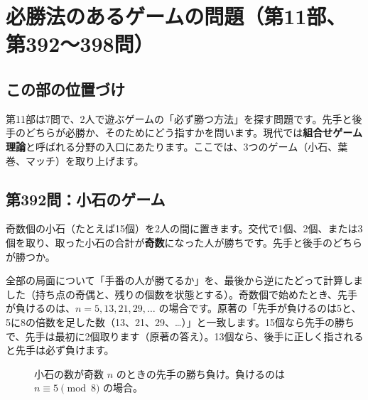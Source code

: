 \documentclass[a4paper,11pt,openany]{ltjsbook}
\begin{document}
\chapter{必勝法のあるゲームの問題（第11部、第392〜398問）}

\section{この部の位置づけ}

第11部は7問で、2人で遊ぶゲームの「必ず勝つ方法」を探す問題です。先手と後手のどちらが必勝か、そのためにどう指すかを問います。現代では\textbf{組合せゲーム理論}と呼ばれる分野の入口にあたります。ここでは、3つのゲーム（小石、葉巻、マッチ）を取り上げます。

\section{第392問：小石のゲーム}

奇数個の小石（たとえば15個）を2人の間に置きます。交代で1個、2個、または3個を取り、取った小石の合計が\textbf{奇数}になった人が勝ちです。先手と後手のどちらが勝つか。

全部の局面について「手番の人が勝てるか」を、最後から逆にたどって計算しました（持ち点の奇偶と、残りの個数を状態とする）。奇数個で始めたとき、先手が負けるのは、$n=5,13,21,29,\ldots$ の場合です。原著の「先手が負けるのは5と、5に8の倍数を足した数（13、21、29、…）」と一致します。15個なら先手の勝ちで、先手は最初に2個取ります（原著の答え）。13個なら、後手に正しく指されると先手は必ず負けます。

\begin{figure}[htbp]
\centering
{}
\caption{小石の数が奇数 $n$ のときの先手の勝ち負け。負けるのは $n\equiv5\pmod 8$ の場合。}
\end{figure}
\end{document}
